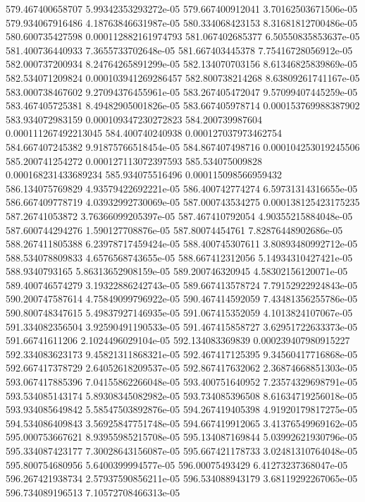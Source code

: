 {579.467400658707 5.99342353293272e-05
579.667400912041 3.70162503671506e-05
579.934067916486 4.18763846631987e-05
580.334068423153 8.31681812700486e-05
580.600735427598 0.000112882161974793
581.067402685377 6.50550835853637e-05
581.400736440933 7.3655733702648e-05
581.667403445378 7.75416728056912e-05
582.000737200934 8.24764265891299e-05
582.134070703156 8.61346825839869e-05
582.534071209824 0.000103941269286457
582.800738214268 8.63809261741167e-05
583.000738467602 9.27094376455961e-05
583.267405472047 9.57099407445259e-05
583.467405725381 8.49482905001826e-05
583.667405978714 0.000153769988387902
583.934072983159 0.000109347230272823
584.200739987604 0.000111267492213045
584.400740240938 0.000127037973462754
584.667407245382 9.91875766518454e-05
584.867407498716 0.000104253019245506
585.200741254272 0.000127113072397593
585.534075009828 0.000168231433689234
585.934075516496 0.000115098566959432
586.134075769829 4.93579422692221e-05
586.400742774274 6.59731314316655e-05
586.667409778719 4.03932992730069e-05
587.000743534275 0.000138125423175235
587.26741053872 3.76366099205397e-05
587.467410792054 4.90355215884048e-05
587.600744294276 1.590127708876e-05
587.80074454761 7.82876448902686e-05
588.267411805388 6.23978717459424e-05
588.400745307611 3.80893480992712e-05
588.534078809833 4.6576568743655e-05
588.667412312056 5.14934310427421e-05
588.9340793165 5.86313652908159e-05
589.200746320945 4.58302156120071e-05
589.400746574279 3.19322886242743e-05
589.667413578724 7.79152922924843e-05
590.200747587614 4.75849099796922e-05
590.467414592059 7.43481356255786e-05
590.800748347615 5.49837927146935e-05
591.067415352059 4.1013824107067e-05
591.334082356504 3.92590491190533e-05
591.467415858727 3.62951722633373e-05
591.66741611206 2.1024496029104e-05
592.134083369839 0.000239407980915227
592.334083623173 9.45821311868321e-05
592.467417125395 9.34560417716868e-05
592.667417378729 2.64052618209537e-05
592.867417632062 2.36874668851303e-05
593.067417885396 7.04155862266048e-05
593.400751640952 7.23574329698791e-05
593.534085143174 5.89308345082982e-05
593.734085396508 8.61634719256018e-05
593.934085649842 5.58547503892876e-05
594.267419405398 4.91920179817275e-05
594.534086409843 3.56925847751748e-05
594.667419912065 3.41376549969162e-05
595.000753667621 8.93955985215708e-05
595.134087169844 5.03992621930796e-05
595.334087423177 7.30028643156087e-05
595.667421178733 3.02481310764048e-05
595.800754680956 5.6400399994577e-05
596.00075493429 6.41273237368047e-05
596.267421938734 2.57937590856211e-05
596.534088943179 3.68119292267065e-05
596.734089196513 7.10572708466313e-05
}

